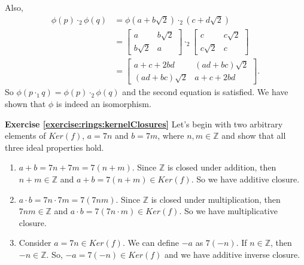 Also, 
\begin{align*}
\phi(p)\cdot_2\phi(q)&=\phi(a+b\sqrt{2})\cdot_2(c+d\sqrt{2})\\
&=
\begin{bmatrix}
a & b \sqrt{2}\\
b \sqrt{2} & a
\end{bmatrix} \cdot_2
\begin{bmatrix}
c & c \sqrt{2}\\
c \sqrt{2} & c
\end{bmatrix}\\
&=
\begin{bmatrix}
a+c+2bd & (ad+bc) \sqrt{2}\\
(ad+bc) \sqrt{2} & a+c+2bd
\end{bmatrix}.
\end{align*}
So $\phi(p\cdot_1q)=\phi(p)\cdot_2\phi(q)$ and the second equation is satisfied.  We have shown that $\phi$ is indeed an isomorphism.


\noindent\textbf{Exercise \ref{exercise:rings:kernelClosures}}
Let's begin with two arbitrary elements of $Ker(f)$, $a=7n$ and $b=7m$, where $n,m\in{\mathbb Z}$ and show that all three ideal properties hold.
\begin{enumerate}
\item $a+b=7n+7m=7(n+m)$.  Since ${\mathbb Z}$ is closed under addition, then $n+m\in{\mathbb Z}$ and $a+b=7(n+m)\in Ker(f)$.  So we have additive closure.
\item $a\cdot b=7n\cdot 7m=7(7nm)$.  Since ${\mathbb Z}$ is closed under multiplication, then $7nm\in{\mathbb Z}$ and $a\cdot b=7(7n\cdot m)\in Ker(f)$.  So we have multiplicative closure.
\item Consider $a=7n\in Ker(f)$.  We can define $-a$ as $7(-n)$.  If $n\in{\mathbb Z}$, then $-n\in{\mathbb Z}$.  So, $-a=7(-n)\in Ker(f)$ and we have additive inverse closure.
\end{enumerate}


